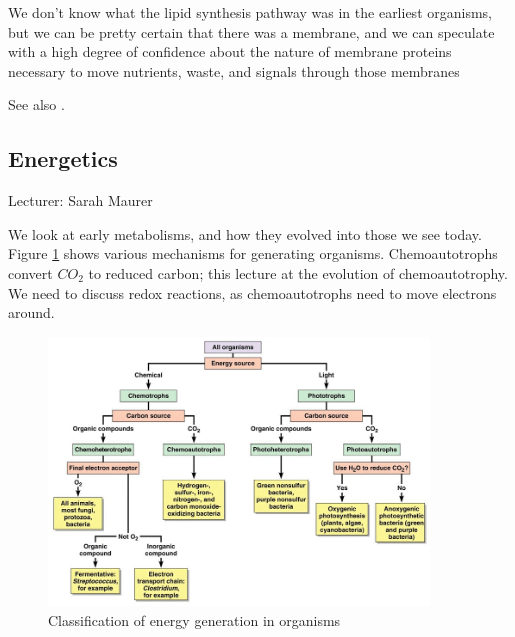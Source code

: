 \documentclass[]{article}
\begin{document}
We don't know what the lipid synthesis pathway was in the earliest organisms, but we can be pretty certain that there was a membrane, and we can speculate with a high degree of confidence about the nature of membrane proteins necessary to move nutrients, waste, and signals through those membranes

See also \cite{weiss2016physiology,bar2011survey,fuchs2011alternative}.

\subsection{Energetics}

Lecturer: Sarah Maurer

We look at early metabolisms, and how they evolved into those we see today. 
Figure \ref{fig:ClassificationEnergyGeneration} shows various mechanisms for generating organisms. Chemoautotrophs convert $CO_2$ to reduced carbon; this lecture at the evolution of chemoautotrophy. We need to discuss redox reactions, as chemoautotrophs need to move electrons around.

\begin{figure}[H]
	\caption{Classification of energy generation in organisms} \label{fig:ClassificationEnergyGeneration} 
	\includegraphics[width=0.9\textwidth]{ClassificationEnergyGeneration}
\end{figure}
\end{document}

